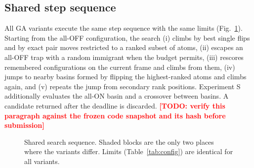 \documentclass[conference]{IEEEtran}
\newcommand{\TODO}[1]{\textbf{\textcolor{red}{[TODO: #1]}}}
\begin{document}
\subsection{Shared step sequence}
All GA variants execute the same step sequence with the same limits (Fig.~\ref{fig:steps}). Starting from the all-OFF configuration, the search (i) climbs by best single flips and by exact pair moves restricted to a ranked subset of atoms, (ii) escapes an all-OFF trap with a random immigrant when the budget permits, (iii) rescores remembered configurations on the current frame and climbs from them, (iv) jumps to nearby basins formed by flipping the highest-ranked atoms and climbs again, and (v) repeats the jump from secondary rank positions. Experiment S additionally evaluates the all-ON basin and a crossover between basins. A candidate returned after the deadline is discarded. \TODO{verify this paragraph against the frozen code snapshot and its hash before submission}

\begin{figure}[t]
\centering
{}
\caption{Shared search sequence. Shaded blocks are the only two places where the variants differ. Limits (Table~\ref{tab:config}) are identical for all variants.}
\label{fig:steps}
\end{figure}
\end{document}
